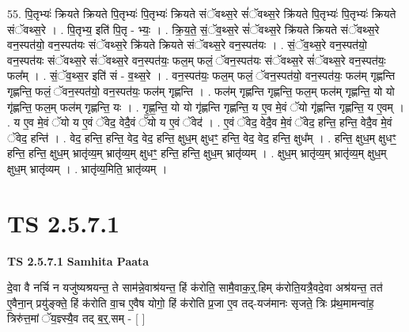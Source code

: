 \documentclass[17pt]{extarticle}
\begin{document}
55. पि॒तृभ्यः॑ क्रियते क्रियते पि॒तृभ्यः॑ पि॒तृभ्यः॑ क्रियते संॅवथ्स॒रे सं॑ॅवथ्स॒रे क्रि॑यते पि॒तृभ्यः॑ पि॒तृभ्यः॑ क्रियते संॅवथ्स॒रे । . पि॒तृभ्य॒ इति॑ पि॒तृ - भ्यः॒ । . क्रि॒य॒ते॒ सं॒ॅव॒थ्स॒रे सं॑ॅवथ्स॒रे क्रि॑यते क्रियते संॅवथ्स॒रे वन॒स्पत॑यो॒ वन॒स्पत॑यः संॅवथ्स॒रे क्रि॑यते क्रियते संॅवथ्स॒रे वन॒स्पत॑यः । . सं॒ॅव॒थ्स॒रे वन॒स्पत॑यो॒ वन॒स्पत॑यः संॅवथ्स॒रे सं॑ॅवथ्स॒रे वन॒स्पत॑यः॒ फल॒म् फलं॒ ॅवन॒स्पत॑यः संॅवथ्स॒रे सं॑ॅवथ्स॒रे वन॒स्पत॑यः॒ फल᳚म् । . सं॒ॅव॒थ्स॒र इति॑ सं - व॒थ्स॒रे । . वन॒स्पत॑यः॒ फल॒म् फलं॒ ॅवन॒स्पत॑यो॒ वन॒स्पत॑यः॒ फल॑म् गृह्णन्ति गृह्णन्ति॒ फलं॒ ॅवन॒स्पत॑यो॒ वन॒स्पत॑यः॒ फल॑म् गृह्णन्ति । . फल॑म् गृह्णन्ति गृह्णन्ति॒ फल॒म् फल॑म् गृह्णन्ति॒ यो यो गृ॑ह्णन्ति॒ फल॒म् फल॑म् गृह्णन्ति॒ यः । . गृ॒ह्ण॒न्ति॒ यो यो गृ॑ह्णन्ति गृह्णन्ति॒ य ए॒व मे॒वं ॅयो गृ॑ह्णन्ति गृह्णन्ति॒ य ए॒वम् । . य ए॒व मे॒वं ॅयो य ए॒वं ॅवेद॒ वेदै॒वं ॅयो य ए॒वं ॅवेद॑ । . ए॒वं ॅवेद॒ वेदै॒व मे॒वं ॅवेद॒ हन्ति॒ हन्ति॒ वेदै॒व मे॒वं ॅवेद॒ हन्ति॑ । . वेद॒ हन्ति॒ हन्ति॒ वेद॒ वेद॒ हन्ति॒ क्षुध॒म् क्षुधꣳ॒॒ हन्ति॒ वेद॒ वेद॒ हन्ति॒ क्षुध᳚म् । . हन्ति॒ क्षुध॒म् क्षुधꣳ॒॒ हन्ति॒ हन्ति॒ क्षुध॒म् भ्रातृ॑व्य॒म् भ्रातृ॑व्य॒म् क्षुधꣳ॒॒ हन्ति॒ हन्ति॒ क्षुध॒म् भ्रातृ॑व्यम् । . क्षुध॒म् भ्रातृ॑व्य॒म् भ्रातृ॑व्य॒म् क्षुध॒म् क्षुध॒म् भ्रातृ॑व्यम् । . भ्रातृ॑व्य॒मिति॒ भ्रातृ॑व्यम् । \newline
\pagebreak
{}
\section*{ TS 2.5.7.1 }

\textbf{TS 2.5.7.1 } \newline
\textbf{Samhita Paata} \newline

दे॒वा वै नर्चि न यजु॑ष्यश्रयन्त॒ ते साम॑न्ने॒वाश्र॑यन्त॒ हिं क॑रोति॒ सामै॒वाक॒॒र्॒.हिम् क॑रोति॒यत्रै॒वदे॒वा अश्र॑यन्त॒ तत॑ ए॒वैना॒न् प्रयु॑ङ्क्ते॒ हिं क॑रोति वा॒च ए॒वैष योगो॒ हिं क॑रोति प्र॒जा ए॒व तद्-यज॑मानः सृजते॒ त्रिः प्र॑थ॒मामन्वा॑ह॒ त्रिरु॑त्त॒मां ॅय॒ज्ञ्स्यै॒व तद् ब॒र्॒.सम् - [  ] \newline
\end{document}
